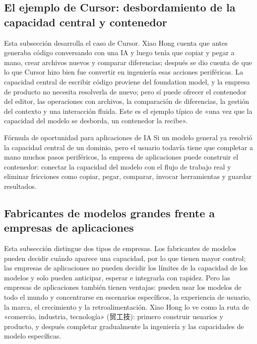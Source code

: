 \documentclass[a4paper]{article}
\begin{document}
\subsection{El ejemplo de Cursor: desbordamiento de la capacidad central y contenedor}

Esta subsección desarrolla el caso de Cursor. Xiao Hong cuenta que antes generaba código conversando con una IA y luego tenía que copiar y pegar a mano, crear archivos nuevos y comparar diferencias; después se dio cuenta de que lo que Cursor hizo bien fue convertir en ingeniería esas acciones periféricas. La capacidad central de escribir código proviene del foundation model, y la empresa de producto no necesita resolverla de nuevo; pero sí puede ofrecer el contenedor del editor, las operaciones con archivos, la comparación de diferencias, la gestión del contexto y una interacción fluida. Este es el ejemplo típico de «una vez que la capacidad del modelo se desborda, un contenedor la recibe».

\begin{importantbox}{Fórmula de oportunidad para aplicaciones de IA}
Si un modelo general ya resolvió la capacidad central de un dominio, pero el usuario todavía tiene que completar a mano muchos pasos periféricos, la empresa de aplicaciones puede construir el contenedor: conectar la capacidad del modelo con el flujo de trabajo real y eliminar fricciones como copiar, pegar, comparar, invocar herramientas y guardar resultados.
\end{importantbox}

\subsection{Fabricantes de modelos grandes frente a empresas de aplicaciones}

Esta subsección distingue dos tipos de empresas. Los fabricantes de modelos pueden decidir cuándo aparece una capacidad, por lo que tienen mayor control; las empresas de aplicaciones no pueden decidir los límites de la capacidad de los modelos y solo pueden anticipar, esperar e integrarla con rapidez. Pero las empresas de aplicaciones también tienen ventajas: pueden usar los modelos de todo el mundo y concentrarse en escenarios específicos, la experiencia de usuario, la marca, el crecimiento y la retroalimentación. Xiao Hong lo ve como la ruta de «comercio, industria, tecnología» (贸工技): primero construir usuarios y producto, y después completar gradualmente la ingeniería y las capacidades de modelo específicas.
\end{document}

